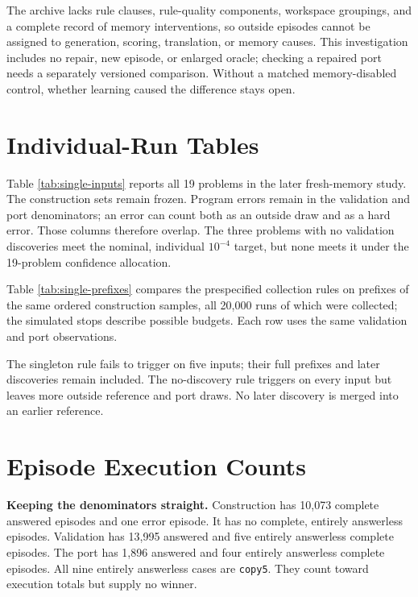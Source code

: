 \documentclass[10pt,letterpaper]{article}
\begin{document}
The archive lacks rule clauses, rule-quality components, workspace groupings, and a
complete record of memory interventions, so outside episodes cannot be assigned to
generation, scoring, translation, or memory causes. This investigation includes no repair,
new episode, or enlarged oracle; checking a repaired port needs a separately versioned
comparison. Without a matched memory-disabled control, whether learning caused the
difference stays open.

\clearpage

\section{Individual-Run Tables}\label{app:single-study}

Table \ref{tab:single-inputs} reports all 19 problems in the later fresh-memory study. The
construction sets remain frozen. Program errors remain in the validation and port
denominators; an error can count both as an outside draw and as a hard error. Those
columns therefore overlap. The three problems with no validation discoveries meet the
nominal, individual \(10^{-4}\) target, but none meets it under the 19-problem confidence
allocation.



Table \ref{tab:single-prefixes} compares the prespecified collection rules on prefixes of
the same ordered construction samples, all 20,000 runs of which were collected; the
simulated stops describe possible budgets. Each row uses the same validation and port
observations.

The singleton rule fails to trigger on five inputs; their full prefixes and later
discoveries remain included. The no-discovery rule triggers on every input but leaves more
outside reference and port draws. No later discovery is merged into an earlier reference.



\clearpage

\section{Episode Execution Counts}\label{app:episodic-comparisons}

\textbf{Keeping the denominators straight.} Construction has 10,073 complete answered
episodes and one error episode. It has no complete, entirely answerless episodes.
Validation has 13,995 answered and five entirely answerless complete episodes. The port
has 1,896 answered and four entirely answerless complete episodes. All nine entirely
answerless cases are \texttt{copy5}. They count toward execution totals but supply no
winner.
\end{document}
